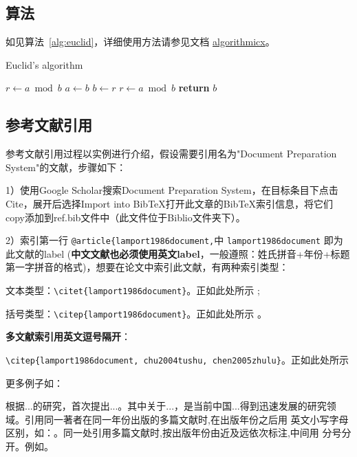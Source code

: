 \subsection{算法}

如见算法~\ref{alg:euclid}，详细使用方法请参见文档 \href{https://ctan.org/pkg/algorithmicx?lang=en}{algorithmicx}。

\begin{algorithm}[!htbp]
    \small
    \caption{Euclid's algorithm}\label{alg:euclid}
    \begin{algorithmic}[1]
        \State $r\gets a\bmod b$
        \State $a\gets b$
        \State $b\gets r$
        \State $r\gets a\bmod b$
        \EndWhile\label{euclidendwhile}
        \State \textbf{return} $b$
        \EndProcedure
    \end{algorithmic}
\end{algorithm}

\subsection{参考文献引用}

参考文献引用过程以实例进行介绍，假设需要引用名为"Document Preparation System"的文献，步骤如下：

1）使用Google Scholar搜索Document Preparation System，在目标条目下点击Cite，展开后选择Import into BibTeX打开此文章的BibTeX索引信息，将它们copy添加到ref.bib文件中（此文件位于Biblio文件夹下）。

2）索引第一行 \verb|@article{lamport1986document,|中 \verb|lamport1986document| 即为此文献的label (\textbf{中文文献也必须使用英文label}，一般遵照：姓氏拼音+年份+标题第一字拼音的格式)，想要在论文中索引此文献，有两种索引类型：

文本类型：\verb|\citet{lamport1986document}|。正如此处所示 \citet{lamport1986document};

括号类型：\verb|\citep{lamport1986document}|。正如此处所示 \citep{lamport1986document}。

\textbf{多文献索引用英文逗号隔开}：

\verb|\citep{lamport1986document, chu2004tushu, chen2005zhulu}|。正如此处所示 \citep{lamport1986document, chu2004tushu, chen2005zhulu}

更多例子如：

\citet{walls2013drought}根据...的研究，首次提出...。其中关于...\citep{walls2013drought}，是当前中国...得到迅速发展的研究领域\citep{chen1980zhongguo}。引用同一著者在同一年份出版的多篇文献时,在出版年份之后用
英文小写字母区别，如：\citep{yuan2012lana, yuan2012lanb, yuan2012lanc}。同一处引用多篇文献时,按出版年份由近及远依次标注,中间用
分号分开。例如\citep{chen1980zhongguo, stamerjohanns2009mathml, hls2012jinji, niu2013zonghe}。

